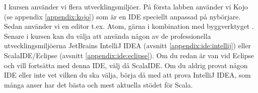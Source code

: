 I kursen använder vi flera utvecklingsmiljöer. På första labben använder vi Kojo (se appendix \ref{appendix:kojo}) som är en IDE speciellt anpassad på nybörjare. Sedan använder vi en editor t.ex. Atom, gärna i kombination med byggverktyget . Senare i kursen kan du välja att använda någon av de professionella utvecklingsmiljöerna JetBrains IntelliJ IDEA (avsnitt \ref{appendix:ide:intellij}) eller ScalaIDE/Eclipse (avsnitt \ref{appendix:ide:eclipse}). Om du redan är van vid Eclipse och vill fortsätta med denna IDE, välj då ScalaIDE. Om du aldrig provat någon IDE eller inte vet vilken du ska välja, börja då med att prova IntelliJ IDEA, som många anser har det bästa och mest aktuella stödet för Scala.




\newpage


